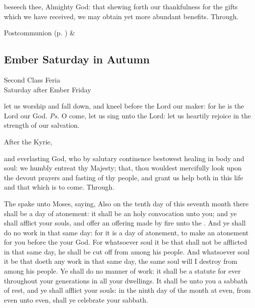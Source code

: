 
\postcommunion
{} beseech thee, Almighty God: that shewing forth our thankfulness for the gifts which we have received, we may obtain yet more abundant benefits. Through.
\begin{rubric}
     Postcommunion  (p. \pageref{SPSaints}) \&  
\end{rubric}


\subsection{Ember Saturday in Autumn}
\begin{inhead}
    {Second Class Feria\\
Saturday after Ember Friday}
\end{inhead}

\introit
{} let us worship and fall down, and kneel before the Lord our maker: for he is the Lord our God. \textit{Ps.} O come, let us sing unto the Lord: let us heartily rejoice in the strength of our salvation.

\begin{rubric}
    After the Kyrie,
\end{rubric}

\collect
{} and everlasting God, who by salutary continence bestowest healing in body and soul: we humbly entreat thy Majesty; that, thou wouldest mercifully look upon the devout prayers and fasting of thy people, and grant us help both in this life and that which is to come. Through.

 The  spake unto Moses, saying, Also on the tenth day of this seventh month there shall be a day of atonement: it shall be an holy convocation unto you; and ye shall afflict your souls, and offer an offering made by fire unto the . And ye shall do no work in that same day: for it is a day of atonement, to make an atonement for you before the  your God. For whatsoever soul it be that shall not be afflicted in that same day, he shall be cut off from among his people. And whatsoever soul it be that doeth any work in that same day, the same soul will I destroy from among his people. Ye shall do no manner of work: it shall be a statute for ever throughout your generations in all your dwellings. It shall be unto you a sabbath of rest, and ye shall afflict your souls: in the ninth day of the month at even, from even unto even, shall ye celebrate your sabbath.

